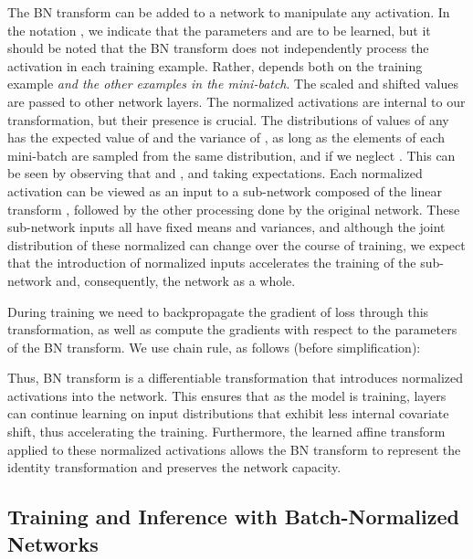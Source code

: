 \documentclass[twocolumn]{article}
\begin{document}
The BN transform  can be added to a network to manipulate any activation. In the notation , we indicate that the parameters  and  are to be learned, but it should be noted that the BN transform does not independently process the activation in each training example. Rather,   depends both on the training example {\em and the other examples in the mini-batch}.
The scaled and shifted values   are passed to other network layers. The normalized activations  are internal to our transformation, but their presence is crucial. The distributions of  values of any   has the
expected value of  and the variance of , as long as the elements of each mini-batch are 
 sampled from the same distribution, and if we neglect .  This can be seen by observing that  and
, and  taking expectations. Each normalized activation  can be viewed as an input to a sub-network composed of the linear transform , followed by the other processing done by the original network. These sub-network inputs all have fixed means and variances, and although the joint distribution of these normalized  can change over the course of  training, we expect that the introduction of  normalized inputs accelerates the training of the sub-network and, consequently, the network as a whole. 
  
During training we need to  backpropagate the gradient of loss  through
this transformation, as well  as  compute the  gradients with respect to the parameters of the BN transform. We use  chain rule, as follows (before
simplification):

Thus, BN transform is a differentiable transformation that introduces  normalized activations
into the network. This ensures that as the model is training, layers can continue learning on input distributions that exhibit less internal covariate shift, thus accelerating the training.
Furthermore, the learned affine transform applied to these normalized activations allows the BN transform  to represent the identity transformation and preserves the network capacity.

\subsection{Training and Inference with Batch-Normalized Networks}
\label{sec-training}
\end{document}
